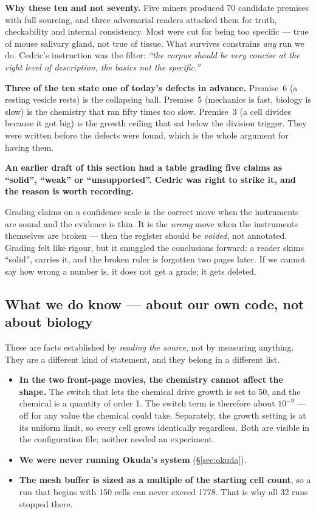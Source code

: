 \documentclass[11pt,a4paper]{article}
\begin{document}
\textbf{Why these ten and not seventy.} Five miners produced 70 candidate premises with full
sourcing, and three adversarial readers attacked them for truth, checkability and internal
consistency. Most were cut for being too specific --- true of mouse salivary gland, not true of
tissue. What survives constrains \emph{any} run we do. Cedric's instruction was the filter:
\emph{``the corpus should be very concise at the right level of description, the basics not the
specific.''}

\textbf{Three of the ten state one of today's defects in advance.} Premise~6 (a resting vesicle
rests) is the collapsing ball. Premise~5 (mechanics is fast, biology is slow) is the chemistry that
ran fifty times too slow. Premise~3 (a cell divides because it got big) is the growth ceiling that
sat below the division trigger. They were written before the defects were found, which is the whole
argument for having them.

\textbf{An earlier draft of this section had a table grading five claims as ``solid'', ``weak'' or
``unsupported''. Cedric was right to strike it, and the reason is worth recording.}

Grading claims on a confidence scale is the correct move when the instruments are sound and the
evidence is thin. It is the \emph{wrong} move when the instruments themselves are broken --- then
the register should be \emph{voided}, not annotated. Grading felt like rigour, but it smuggled the
conclusions forward: a reader skims ``solid'', carries it, and the broken ruler is forgotten two
pages later. If we cannot say how wrong a number is, it does not get a grade; it gets deleted.

\subsection{What we do know --- about our own code, not about biology}

These are facts established by \emph{reading the source}, not by measuring anything. They are a
different kind of statement, and they belong in a different list.

\begin{itemize}
\item \textbf{In the two front-page movies, the chemistry cannot affect the shape.} The switch that
lets the chemical drive growth is set to 50, and the chemical is a quantity of order 1. The switch
term is therefore about $10^{-9}$ --- off for any value the chemical could take. Separately, the
growth setting is at its uniform limit, so every cell grows identically regardless. Both are
visible in the configuration file; neither needed an experiment.
\item \textbf{We were never running Okuda's system} (\S\ref{sec:okuda}).
\item \textbf{The mesh buffer is sized as a multiple of the starting cell count}, so a run that
begins with 150 cells can never exceed 1778. That is why all 32 runs stopped there.
\end{itemize}
\end{document}
